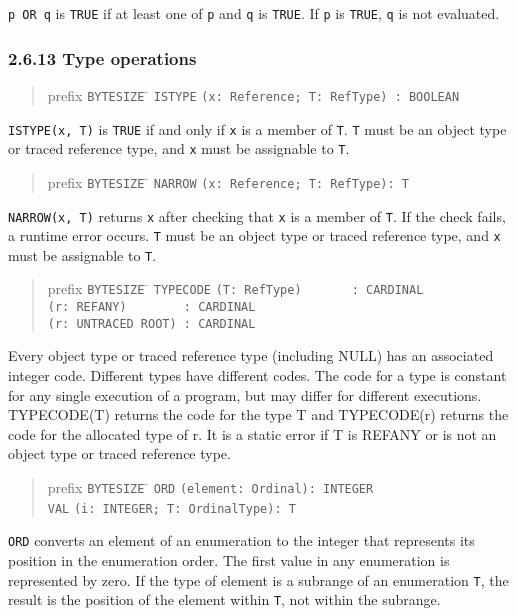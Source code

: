 \documentclass[10pt]{article}
\begin{document}
\verb|p OR q| is \verb|TRUE| if at least one of \verb|p| and \verb|q| is
\verb|TRUE|.  If \verb|p| is \verb|TRUE|, \verb|q| is not evaluated.

\subsubsection*{2.6.13 Type operations}

\begin{quote}
  \begin{tabbing}
    prefix \= \verb|BYTESIZE| \= \kill
           \> \verb|ISTYPE| \> \verb|(x: Reference; T: RefType) : BOOLEAN|
  \end{tabbing}
\end{quote}
\verb|ISTYPE(x, T)| is \verb|TRUE| if and only if \verb|x| is a member of
\verb|T|.  \verb|T| must be an object type or traced reference type, and
\verb|x| must be assignable to \verb|T|.
\begin{quote}
  \begin{tabbing}
    prefix \= \verb|BYTESIZE| \= \kill
           \> \verb|NARROW| \> \verb|(x: Reference; T: RefType): T|
  \end{tabbing}
\end{quote}
\verb|NARROW(x, T)| returns \verb|x| after checking that \verb|x| is a member
of \verb|T|.  If the check fails, a runtime error occurs.  \verb|T| must be an
object type or traced reference type, and \verb|x| must be assignable to
\verb|T|.

\begin{quote}
  \begin{tabbing}
    prefix \= \verb|BYTESIZE| \= \kill
           \> \verb|TYPECODE| \> \verb|(T: RefType)       : CARDINAL| \\
           \>                 \> \verb|(r: REFANY)        : CARDINAL| \\
           \>                 \> \verb|(r: UNTRACED ROOT) : CARDINAL|
  \end{tabbing}
\end{quote}
Every object type or traced reference type (including NULL) has an associated
integer code.  Different types have different codes.  The code for a type is
constant for any single execution of a program, but may differ for different
executions.  TYPECODE(T) returns the code for the type T and TYPECODE(r)
returns the code for the allocated type of r.  It is a static error if T is
REFANY or is not an object type or traced reference type.

\begin{quote}
  \begin{tabbing}
    prefix \= \verb|BYTESIZE| \= \kill
           \> \verb|ORD| \> \verb|(element: Ordinal): INTEGER| \\
           \> \verb|VAL| \> \verb|(i: INTEGER; T: OrdinalType): T|
  \end{tabbing}
\end{quote}
\verb|ORD| converts an element of an enumeration to the integer that
represents its position in the enumeration order.  The first value in any
enumeration is represented by zero.  If the type of element is a subrange of
an enumeration \verb|T|, the result is the position of the element within
\verb|T|, not within the subrange.
\end{document}
